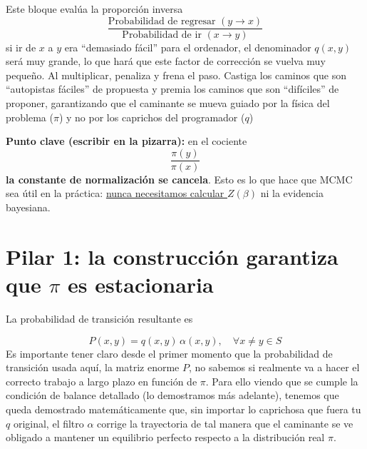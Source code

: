 \begin{observacion}
\begin{itemize}
        \noindent
        Este bloque evalúa la proporción inversa
        $$\frac{\text{Probabilidad de regresar }(y \to x)}{\text{Probabilidad de ir }(x \to y)}$$
        si ir de $x$ a $y$ era ``demasiado fácil'' para el ordenador, el denominador $q(x,y)$ será muy grande, lo que hará que este factor de corrección se vuelva muy pequeño. Al multiplicar, penaliza y frena el paso. Castiga los caminos que son ``autopistas fáciles'' de propuesta y premia los caminos que son ``difíciles'' de proponer, garantizando que el caminante se mueva guiado por la física del problema ($\pi$) y no por los caprichos del programador ($q$)
    \end{itemize}
\end{observacion}


\noindent
\textbf{Punto clave (escribir en la pizarra):} en el cociente 
$$\dfrac{\pi(y)}{\pi(x)}$$ 
\textbf{la constante de normalización se cancela}. Esto es lo que hace que MCMC sea útil en la práctica: \underline{nunca necesitamos calcular $Z(\beta)$} ni la evidencia bayesiana.

\section{Pilar 1: la construcción garantiza que $\pi$ es estacionaria}

\noindent
La probabilidad de transición resultante es

\begin{equation*}
    P(x,y) = q(x,y)\,\alpha(x,y), \quad \forall x\neq y \in S
\end{equation*}
Es importante tener claro desde el primer momento que la probabilidad de transición usada aquí, la matriz enorme $P$, no sabemos si realmente va a hacer el correcto trabajo a largo plazo en función de $\pi$. Para ello viendo que se cumple la condición de balance detallado (lo demostramos más adelante), tenemos que queda demostrado matemáticamente que, sin importar lo caprichosa que fuera tu $q$ original, el filtro $\alpha$ corrige la trayectoria de tal manera que el caminante se ve obligado a mantener un equilibrio perfecto respecto a la distribución real $\pi$.  

